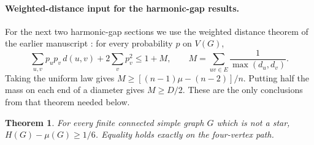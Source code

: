 \documentclass[11pt,a4paper]{article}
\newtheorem{theorem}{Theorem}[section]
\begin{document}
\paragraph{Weighted-distance input for the harmonic-gap results.}
For the next two harmonic-gap sections we use the weighted distance theorem of the earlier manuscript \cite{weighted}: for every probability $p$ on $V(G)$,
\[
 \sum_{u,v}p_up_v\,d(u,v)+2\sum_v p_v^2\le 1+M,\qquad
 M=\sum_{uv\in E}\frac1{\max(d_u,d_v)} .
\]
Taking the uniform law gives $M\ge[(n-1)\mu-(n-2)]/n$. Putting half the mass on each end of a diameter gives $M\ge D/2$. These are the only conclusions from that theorem needed below.
\begin{theorem}\label{thm:hgap-sixth}
For every finite connected simple graph $G$ which is not a star, $H(G)-\mu(G)\ge1/6$. Equality holds exactly on the four-vertex path.
\end{theorem}
\end{document}
